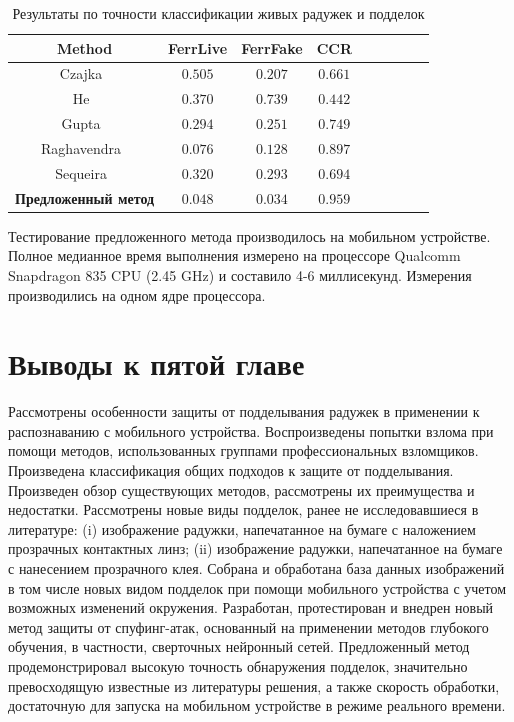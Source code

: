 \begin{table}[t]
	\caption{Результаты по точности классификации живых радужек и подделок}
	\begin{center}
		\begin{tabular}{|c|c|c|c|c|c|c|c|c|}
			\hline
			\textbf{Method}								& \textbf{FerrLive} & \textbf{FerrFake} & \textbf{CCR}      \\
			\hline
			Czajka~\cite{czajka_2013}					& $0.505$          & $0.207$          & $0.661$          \\
			He~\cite{he_2008}							& $0.370$          & $0.739$          & $0.442$          \\
			Gupta~\cite{gupta_2014}						& $0.294$          & $0.251$          & $0.749$          \\
			Raghavendra~\cite{raghavendra_2015}			& $0.076$           & $0.128$          & $0.897$          \\
			Sequeira~\cite{sequeira_2014_2}				& $0.320$          & $0.293$          & $0.694$          \\
			\textbf{Предложенный метод}					& $\mathbf{0.048}$  & $\mathbf{0.034}$  & $\mathbf{0.959}$ \\
			\hline
		\end{tabular}
		\label{tab:anti-spoofing-expresults}
	\end{center}
\end{table}

Тестирование предложенного метода производилось на мобильном устройстве. Полное медианное время выполнения измерено на процессоре Qualcomm Snapdragon 835 CPU (2.45 GHz) и составило 4-6 миллисекунд. Измерения производились на одном ядре процессора.

\section{Выводы к пятой главе}
\label{sec:conclusion-5}

Рассмотрены особенности защиты от подделывания радужек в применении к распознаванию с мобильного устройства. Воспроизведены попытки взлома при помощи методов, использованных группами профессиональных взломщиков. Произведена классификация общих подходов к защите от подделывания. Произведен обзор существующих методов, рассмотрены их преимущества и недостатки. Рассмотрены новые виды подделок, ранее не исследовавшиеся в литературе: (i) изображение радужки, напечатанное на бумаге с наложением прозрачных контактных линз; (ii) изображение радужки, напечатанное на бумаге с нанесением прозрачного клея. Собрана и обработана база данных изображений в том числе новых видом подделок при помощи мобильного устройства с учетом возможных изменений окружения. Разработан, протестирован и внедрен новый метод защиты от спуфинг-атак, основанный на применении методов глубокого обучения, в частности, сверточных нейронный сетей. Предложенный метод продемонстрировал высокую точность обнаружения подделок, значительно превосходящую известные из литературы решения, а также скорость обработки, достаточную для запуска на мобильном устройстве в режиме реального времени.
